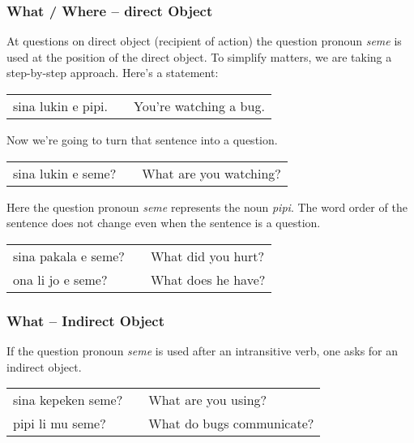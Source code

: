 \subsubsection*{What / Where -- direct Object}
%
%
At questions on direct object (recipient of action) the question pronoun \textit{seme} is used at the position of the direct object.
To simplify matters, we are taking a step-by-step approach.
Here's a statement:

\begin{supertabular}{p{5,5cm}|ll}
sina lukin e pipi. && You're watching a bug. \\
\end{supertabular} 

Now we're going to turn that sentence into a question. 

\begin{supertabular}{p{5,5cm}|ll}
sina lukin e seme? && What are you watching? \\
\end{supertabular} 

Here the question pronoun \textit{seme} represents the noun \textit{pipi}. 
The word order of the sentence does not change even when the sentence is a question. 

\begin{supertabular}{p{5,5cm}|ll}
sina pakala e seme? && What did you hurt? \\
ona li jo e seme? && What does he have? \\
\end{supertabular} 
%
\subsubsection*{What -- Indirect Object}
%

If the question pronoun \textit{seme} is used after an intransitive verb, one asks for an indirect object. 

\begin{supertabular}{p{5,5cm}|ll}
sina kepeken seme? && What are you using? \\
pipi li mu seme? && What do bugs communicate? \\
\end{supertabular} 
%
%
